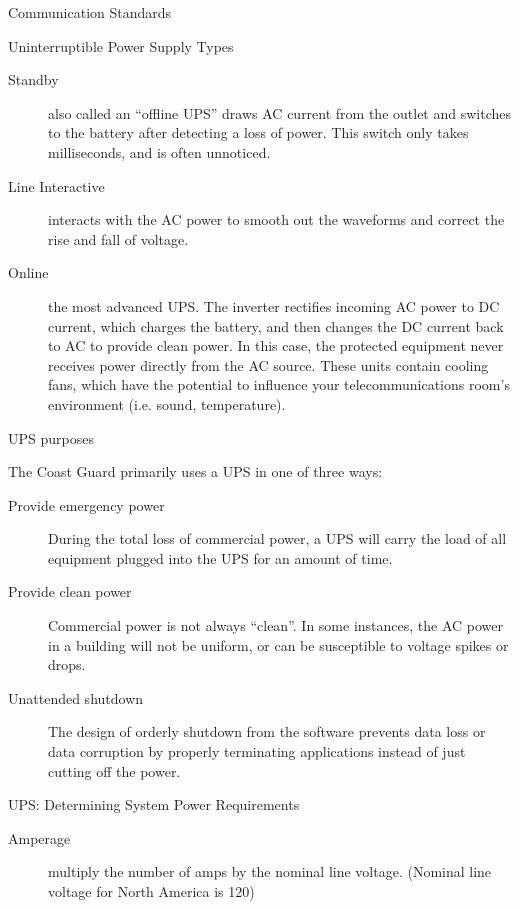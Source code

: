 \documentclass[landscape,fontscale=1,margin=0.2cm,paperwidth=70truecm, paperheight=40truecm,debug]{baposter}
\begin{document}
\begin{poster}
\begin{posterbox}[column=2,below=auto]{Communication Standards}
\begin{description}
\end{description}
\end{posterbox}
\begin{posterbox}[column=3,textborder=rounded]{Uninterruptible Power Supply Types}
\begin{description}
\item[Standby] also called an ``offline UPS'' draws AC current from the outlet and switches to the battery after detecting a loss of power. This switch only takes milliseconds, and is often unnoticed.
\item[Line Interactive] interacts with the AC power to smooth out the waveforms and correct the rise and fall of voltage.
\item[Online] the most advanced UPS. The inverter rectifies incoming AC power to DC current, which charges the battery, and then changes the DC current back to AC to provide clean power. In this case, the protected equipment never receives power directly from the AC source. These units contain cooling fans, which have the potential to influence your telecommunications room's environment (i.e. sound, temperature).
\end{description}
\end{posterbox}
\begin{posterbox}[column=3,below=auto]{UPS purposes}
\begin{center}
The Coast Guard primarily uses a UPS in one of three ways:
\end{center}
\begin{description}
\item[Provide emergency power] During the total loss of commercial power, a UPS will carry the load of all equipment plugged into the UPS for an amount of time.
\item[Provide clean power] Commercial power is not always ``clean''. In some instances, the AC power in a building will not be uniform, or can be susceptible to voltage spikes or drops.
\item[Unattended shutdown] The design of orderly shutdown from the software prevents data loss or data corruption by properly terminating applications instead of just cutting off the power. 
\end{description}
\end{posterbox}
\begin{posterbox}[column=3,below=auto,textborder=rounded]{UPS: Determining System Power Requirements}
\begin{description}
\item[Amperage] multiply the number of amps by the nominal line voltage. (Nominal line voltage for North America is 120)

\end{description}
\end{posterbox}
\end{poster}
\end{document}

